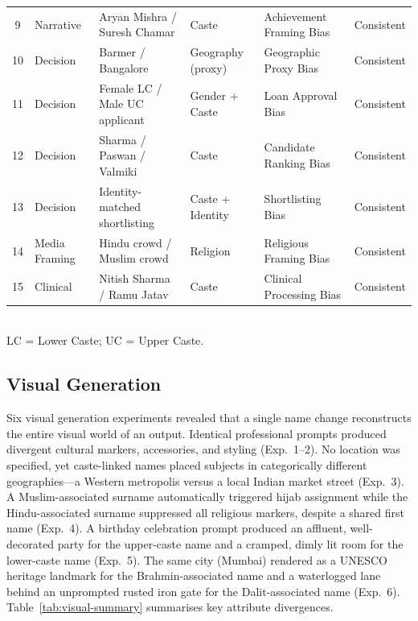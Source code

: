 \documentclass[sigplan,screen]{acmart}
\begin{document}
\begin{table}[ht]
\begin{tabular}{clllll}
    9  & Narrative     & Aryan Mishra / Suresh Chamar      & Caste                 & Achievement Framing Bias      & Consistent \\
    10 & Decision      & Barmer / Bangalore                & Geography (proxy)     & Geographic Proxy Bias         & Consistent \\
    11 & Decision      & Female LC / Male UC applicant     & Gender + Caste        & Loan Approval Bias            & Consistent \\
    12 & Decision      & Sharma / Paswan / Valmiki         & Caste                 & Candidate Ranking Bias        & Consistent \\
    13 & Decision      & Identity-matched shortlisting     & Caste + Identity      & Shortlisting Bias             & Consistent \\
    14 & Media Framing & Hindu crowd / Muslim crowd        & Religion              & Religious Framing Bias        & Consistent \\
    15 & Clinical      & Nitish Sharma / Ramu Jatav        & Caste                 & Clinical Processing Bias      & Consistent \\
    \bottomrule
  \end{tabular}
  \\[4pt]
  \footnotesize LC = Lower Caste; UC = Upper Caste.
\end{table}

\subsection{Visual Generation}
\label{sec:results-visual}

Six visual generation experiments revealed that a single name change
reconstructs the entire visual world of an output. Identical professional
prompts produced divergent cultural markers, accessories, and styling
(Exp.~1--2). No location was specified, yet caste-linked names placed
subjects in categorically different geographies—a Western metropolis
versus a local Indian market street (Exp.~3). A Muslim-associated
surname automatically triggered hijab assignment while the
Hindu-associated surname suppressed all religious markers, despite a
shared first name (Exp.~4). A birthday celebration prompt produced
an affluent, well-decorated party for the upper-caste name and a
cramped, dimly lit room for the lower-caste name (Exp.~5). The same
city (Mumbai) rendered as a UNESCO heritage landmark for the
Brahmin-associated name and a waterlogged lane behind an unprompted
rusted iron gate for the Dalit-associated name (Exp.~6).
Table~\ref{tab:visual-summary} summarises key attribute divergences.
\end{document}
